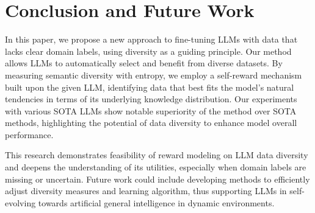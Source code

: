 \section{Conclusion and Future Work}
In this paper, we propose a new approach to fine-tuning LLMs with data that lacks clear domain labels, using diversity as a guiding principle. Our method allows LLMs to automatically select and benefit from diverse datasets. 
By measuring semantic diversity with entropy, we employ a self-reward mechanism built upon the given LLM, identifying data that best fits the model's natural tendencies in terms of its underlying knowledge distribution. 
Our experiments with various SOTA LLMs show notable superiority of the method over SOTA methods, highlighting the potential of data diversity to enhance model overall performance.

This research demonstrates feasibility of reward modeling on LLM data diversity and deepens the understanding of its utilities, especially when domain labels are missing or uncertain. 
Future work could include developing methods to efficiently adjust diversity measures and learning algorithm, thus supporting LLMs in self-evolving towards artificial general intelligence in dynamic environments.





